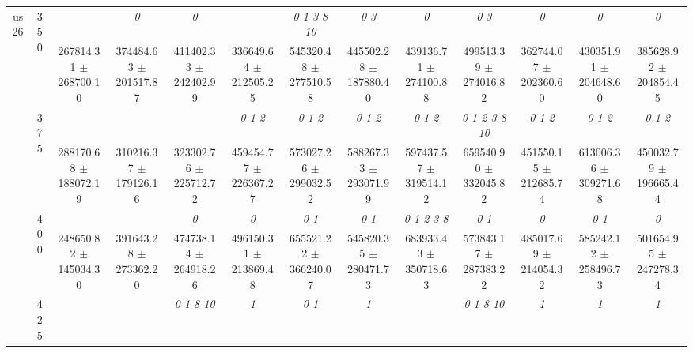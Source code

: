 \begin{table}[h]
{\begin{tabular}{
        ccccccccccccc}
 \multirow{4}{*}{us26} & \multirow{2}{*}{350}& & \textit{ 0 }& \textit{ 0 }& & \textit{  0  1  3  8 10 }& \textit{ 0 3 }& \textit{ 0 }& \textit{ 0 3 }& \textit{ 0 }& \textit{ 0 }& \textit{ 0 } \\ 
 & & 267814.31 $\pm$ 268700.10& 374484.63 $\pm$ 201517.87& 411402.33 $\pm$ 242402.99& 336649.64 $\pm$ 212505.25& 545320.48 $\pm$ 277510.58& 445502.28 $\pm$ 187880.40& 439136.71 $\pm$ 274100.88& 499513.39 $\pm$ 274016.82& 362744.07 $\pm$ 202360.60& 430351.91 $\pm$ 204648.60& 385628.92 $\pm$ 204854.45 \\ 
 & \multirow{2}{*}{375}& \cellcolor[HTML]{EFEFEF} & \cellcolor[HTML]{EFEFEF} & \cellcolor[HTML]{EFEFEF} & \cellcolor[HTML]{EFEFEF} \textit{ 0 1 2 }& \cellcolor[HTML]{EFEFEF} \textit{ 0 1 2 }& \cellcolor[HTML]{EFEFEF} \textit{ 0 1 2 }& \cellcolor[HTML]{EFEFEF} \textit{ 0 1 2 }& \cellcolor[HTML]{EFEFEF} \textit{  0  1  2  3  8 10 }& \cellcolor[HTML]{EFEFEF} \textit{ 0 1 2 }& \cellcolor[HTML]{EFEFEF} \textit{ 0 1 2 }& \cellcolor[HTML]{EFEFEF} \textit{ 0 1 2 } \\ 
 & & \cellcolor[HTML]{EFEFEF} 288170.68 $\pm$ 188072.19& \cellcolor[HTML]{EFEFEF} 310216.37 $\pm$ 179126.16& \cellcolor[HTML]{EFEFEF} 323302.76 $\pm$ 225712.72& \cellcolor[HTML]{EFEFEF} 459454.77 $\pm$ 226367.27& \cellcolor[HTML]{EFEFEF} 573027.26 $\pm$ 299032.52& \cellcolor[HTML]{EFEFEF} 588267.33 $\pm$ 293071.99& \cellcolor[HTML]{EFEFEF} 597437.57 $\pm$ 319514.12& \cellcolor[HTML]{EFEFEF} 659540.90 $\pm$ 332045.82& \cellcolor[HTML]{EFEFEF} 451550.15 $\pm$ 212685.74& \cellcolor[HTML]{EFEFEF} 613006.36 $\pm$ 309271.68& \cellcolor[HTML]{EFEFEF} 450032.79 $\pm$ 196665.44 \\ 
 & \multirow{2}{*}{400}& & & \textit{ 0 }& \textit{ 0 }& \textit{ 0 1 }& \textit{ 0 1 }& \textit{ 0 1 2 3 8 }& \textit{ 0 1 }& \textit{ 0 }& \textit{ 0 1 }& \textit{ 0 } \\ 
 & & 248650.82 $\pm$ 145034.30& 391643.28 $\pm$ 273362.20& 474738.14 $\pm$ 264918.26& 496150.31 $\pm$ 213869.48& 655521.22 $\pm$ 366240.07& 545820.35 $\pm$ 280471.73& 683933.43 $\pm$ 350718.63& 573843.17 $\pm$ 287383.22& 485017.69 $\pm$ 214054.32& 585242.12 $\pm$ 258496.73& 501654.95 $\pm$ 247278.34 \\ 
 & \multirow{2}{*}{425}& \cellcolor[HTML]{EFEFEF} & \cellcolor[HTML]{EFEFEF} & \cellcolor[HTML]{EFEFEF} \textit{  0  1  8 10 }& \cellcolor[HTML]{EFEFEF} \textit{ 1 }& \cellcolor[HTML]{EFEFEF} \textit{ 0 1 }& \cellcolor[HTML]{EFEFEF} \textit{ 1 }& \cellcolor[HTML]{EFEFEF} & \cellcolor[HTML]{EFEFEF} \textit{  0  1  8 10 }& \cellcolor[HTML]{EFEFEF} \textit{ 1 }& \cellcolor[HTML]{EFEFEF} \textit{ 1 }& \cellcolor[HTML]{EFEFEF} \textit{ 1 } \\ 

\end{tabular}}
\end{table}
